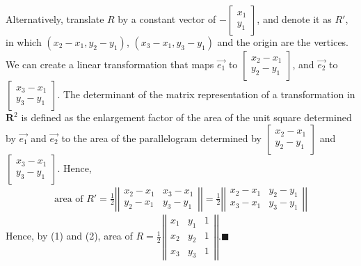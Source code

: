 \documentclass{article}
\begin{document}
Alternatively, translate $R$ by a constant vector of $-\left[\begin{array}{r}
x_1 \\ y_1 \end{array}\right]$, and denote it as $R'$, in which $(x_2-x_1,y_2-y_1)$, $(x_3-x_1,y_3-y_1)$ and the origin are the vertices. \newline
We can create a linear transformation that maps $\Vec{e_1}$ to $\left[\begin{array}{r}x_2-x_1\\y_2-y_1\end{array}\right]$, and $\Vec{e_2}$ to $\left[\begin{array}{r}x_3-x_1\\y_3-y_1\end{array}\right]$. \newline
The determinant of the matrix representation of a transformation in $\mathbf{R}^2$ is defined as the enlargement factor of the area of the unit square determined by $\Vec{e_1}$ and $\Vec{e_2}$ to the area of the parallelogram determined by $\left[\begin{array}{r}x_2-x_1\\y_2-y_1\end{array}\right]$ and $\left[\begin{array}{r}x_3-x_1\\y_3-y_1\end{array}\right]$.\newline
Hence, 
\begin{align}
    \text{area of }R'=\frac{1}{2}\left\vert\left\vert\begin{array}{rr}
x_2-x_1 & x_3-x_1 \\
y_2-x_1 & y_3-y_1
\end{array}\right\vert\right\vert=\frac{1}{2}\left\vert\left\vert\begin{array}{rr}
x_2-x_1 & y_2-y_1 \\
x_3-x_1 & y_3-y_1
\end{array}\right\vert\right\vert
\end{align}
Hence, by (1) and (2), area of $R=\frac{1}{2}\left\vert\left\vert\begin{array}{lll}
x_1 & y_1 & 1 \\ x_2 & y_2 & 1 \\ x_3 & y_3 & 1
\end{array}\right\vert\right\vert.\blacksquare$
\end{document}
